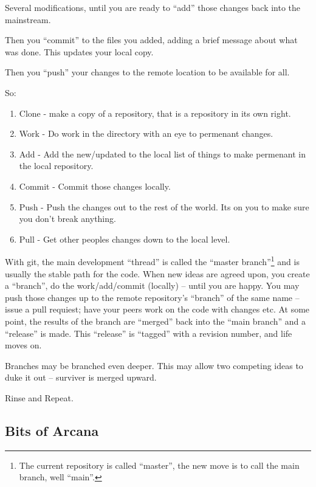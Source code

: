 \documentclass[letter,11pt,oneside]{article}
\begin{document}
Several modifications, until you are ready to ``add'' those changes
back into the mainstream. 

Then you ``commit'' to the files you added, adding a brief message
about what was done. This updates your local copy.

Then you ``push'' your changes to the remote location to be available
for all.

So:

\vspace{-.15cm}
\begin{enumerate}\addtolength{\itemsep}{-0.5\baselineskip}
   \item   Clone - make a copy of a repository, that is a repository in its own
             right.
   \item   Work - Do work in the directory with an eye to permenant changes.
   \item   Add  - Add the new/updated to the local list of things to make
            permenant in the local repository.
   \item   Commit - Commit those changes locally.
   \item   Push - Push the changes out to the rest of the world. Its on you
           to make sure you don't break anything.
   \item   Pull - Get other peoples changes down to the local level.
\end{enumerate}

With git, the main development ``thread'' is called the ``master
branch''\footnote{The current repository is called ``master'', the new move
is to call the main branch, well ``main''.} and is usually the stable 
path for the code. When new ideas are agreed upon, you create a ``branch'',
do the work/add/commit (locally) -- until you are happy. You may push
those changes up to the remote repository's ``branch'' of the same name --
issue a pull requiest; have your peers work on the code with changes etc.
At some point, the results of the branch are ``merged'' back into the ``main
branch'' and a ``release'' is made. This ``release'' is ``tagged'' with
a revision number, and life moves on.

Branches may be branched even deeper. This may allow two competing ideas
to duke it out -- surviver is merged upward.

Rinse and Repeat.

\subsection{Bits of Arcana}
\end{document}
